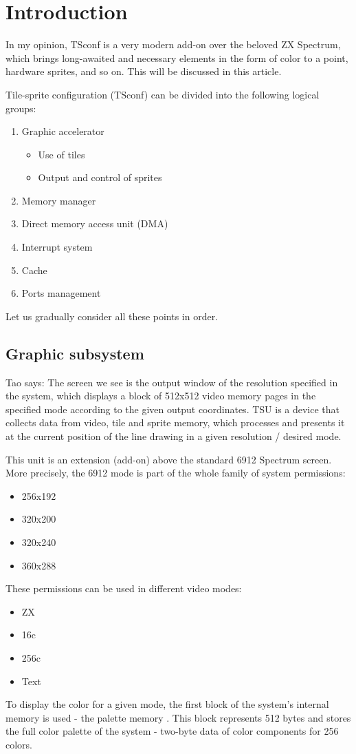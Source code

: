 \chapter{Introduction}
In my opinion, TSconf is a very modern add-on over the beloved ZX
Spectrum, which brings long-awaited and necessary elements in the form
of color to a point, hardware sprites, and so on. This will be
discussed in this article.

Tile-sprite configuration (TSconf) can be divided into the following
logical groups:
\begin{enumerate}
\item Graphic accelerator
  \begin{itemize}
  \item Use of tiles
  \item Output and control of sprites
  \end{itemize}
\item Memory manager
\item Direct memory access unit (DMA)
\item Interrupt system
\item Cache
\item Ports management
\end{enumerate}
Let us gradually consider all these points in order.

\section{Graphic subsystem}
Tao says: The screen we see is the output window of the resolution
specified in the system, which displays a block of 512x512 video
memory pages in the specified mode according to the given output
coordinates. TSU is a device that collects data from video, tile and
sprite memory, which processes and presents it at the current position
of the line drawing in a given resolution / desired mode.

This unit is an extension (add-on) above the standard 6912 Spectrum
screen. More precisely, the 6912 mode is part of the whole family of
system permissions:
\begin{itemize}
\item[] 256x192
\item[] 320x200
\item[] 320x240
\item[] 360x288
\end{itemize}
These permissions can be used in different video modes:
\begin{itemize}
\item[] ZX
\item[] 16c
\item[] 256c
\item[] Text
\end{itemize}
To display the color for a given mode, the first block of the system's
internal memory is used - the palette memory . This block represents
512 bytes and stores the full color palette of the system - two-byte
data of color components for 256 colors.

